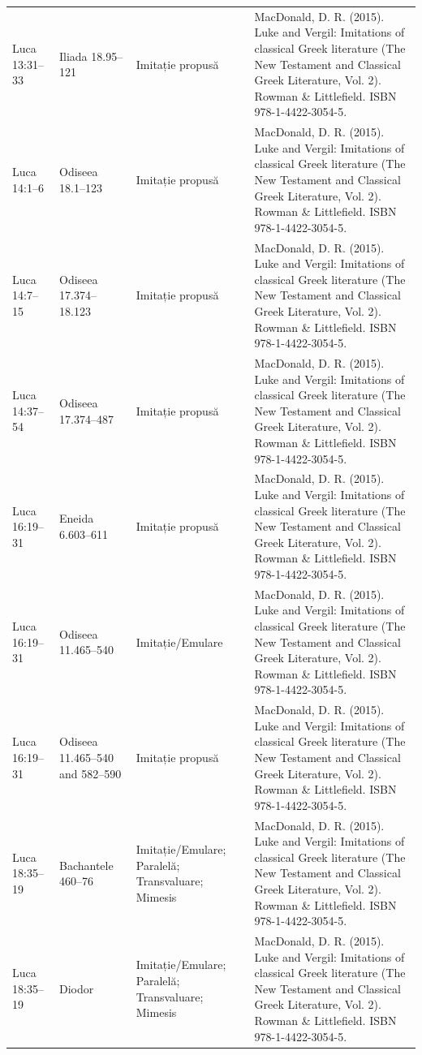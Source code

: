\documentclass[12pt,a4paper,twoside,openany]{book}
\begin{document}
\begin{longtable}{L{1.4cm}L{1.7cm}L{3.1cm}L{8.4cm}}
Luca 13:31–33 & Iliada 18.95–121 & Imitație propusă & MacDonald, D. R. (2015). Luke and Vergil: Imitations of classical Greek literature (The New Testament and Classical Greek Literature, Vol. 2). Rowman \& Littlefield. ISBN 978-1-4422-3054-5. \\
Luca 14:1–6 & Odiseea 18.1–123 & Imitație propusă & MacDonald, D. R. (2015). Luke and Vergil: Imitations of classical Greek literature (The New Testament and Classical Greek Literature, Vol. 2). Rowman \& Littlefield. ISBN 978-1-4422-3054-5. \\
Luca 14:7–15 & Odiseea 17.374–18.123 & Imitație propusă & MacDonald, D. R. (2015). Luke and Vergil: Imitations of classical Greek literature (The New Testament and Classical Greek Literature, Vol. 2). Rowman \& Littlefield. ISBN 978-1-4422-3054-5. \\
Luca 14:37–54 & Odiseea 17.374–487 & Imitație propusă & MacDonald, D. R. (2015). Luke and Vergil: Imitations of classical Greek literature (The New Testament and Classical Greek Literature, Vol. 2). Rowman \& Littlefield. ISBN 978-1-4422-3054-5. \\
Luca 16:19–31 & Eneida 6.603–611 & Imitație propusă & MacDonald, D. R. (2015). Luke and Vergil: Imitations of classical Greek literature (The New Testament and Classical Greek Literature, Vol. 2). Rowman \& Littlefield. ISBN 978-1-4422-3054-5. \\
Luca 16:19–31 & Odiseea 11.465–540 & Imitație/Emulare & MacDonald, D. R. (2015). Luke and Vergil: Imitations of classical Greek literature (The New Testament and Classical Greek Literature, Vol. 2). Rowman \& Littlefield. ISBN 978-1-4422-3054-5. \\
Luca 16:19–31 & Odiseea 11.465–540 and 582–590 & Imitație propusă & MacDonald, D. R. (2015). Luke and Vergil: Imitations of classical Greek literature (The New Testament and Classical Greek Literature, Vol. 2). Rowman \& Littlefield. ISBN 978-1-4422-3054-5. \\
Luca 18:35–19 & Bachantele 460–76 & Imitație/Emulare; Paralelă; Transvaluare; Mimesis & MacDonald, D. R. (2015). Luke and Vergil: Imitations of classical Greek literature (The New Testament and Classical Greek Literature, Vol. 2). Rowman \& Littlefield. ISBN 978-1-4422-3054-5. \\
Luca 18:35–19 & Diodor & Imitație/Emulare; Paralelă; Transvaluare; Mimesis & MacDonald, D. R. (2015). Luke and Vergil: Imitations of classical Greek literature (The New Testament and Classical Greek Literature, Vol. 2). Rowman \& Littlefield. ISBN 978-1-4422-3054-5. \\

\end{longtable}
\end{document}
